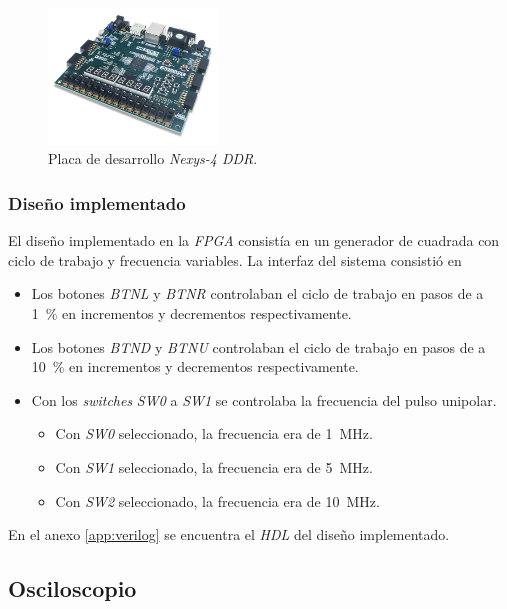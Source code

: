 \begin{figure}
  \centering
    \includegraphics[width=0.4\textwidth]{images/mediciones_fpga.png}
    \caption{Placa de desarrollo \textit{Nexys-4 DDR}.}
    \label{fig:mediciones_fpga}
\end{figure}

\subsubsection{Diseño implementado}

El diseño implementado en la \textit{FPGA} consistía en un generador de cuadrada con
ciclo de trabajo y frecuencia variables. La interfaz del sistema consistió en

\begin{itemize}
  \item Los botones \textit{BTNL} y \textit{BTNR} controlaban el ciclo de
    trabajo en pasos de a \qty{1}{\percent} en incrementos y decrementos
    respectivamente.
  \item Los botones \textit{BTND} y \textit{BTNU} controlaban el ciclo de
    trabajo en pasos de a \qty{10}{\percent} en incrementos y decrementos
    respectivamente.
  \item Con los \textit{switches} \textit{SW0} a \textit{SW1} se controlaba la
    frecuencia del pulso unipolar.
    \begin{itemize}
      \item Con \textit{SW0} seleccionado, la frecuencia era de
        \qty{1}{\mega\hertz}.
      \item Con \textit{SW1} seleccionado, la frecuencia era de
        \qty{5}{\mega\hertz}.
      \item Con \textit{SW2} seleccionado, la frecuencia era de
        \qty{10}{\mega\hertz}.
    \end{itemize}
\end{itemize}

En el anexo \ref{app:verilog} se encuentra el \textit{HDL} del diseño implementado.

\subsection{Osciloscopio}

